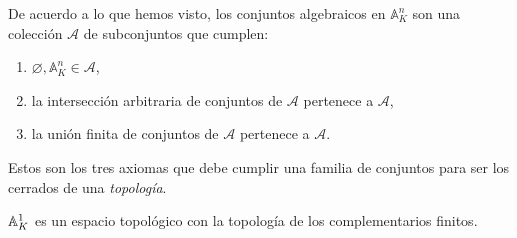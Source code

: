 \documentclass[./main.tex]{subfiles}
\begin{document}
	De acuerdo a lo que hemos visto, los conjuntos algebraicos en $\mathbb A^n_K$ son una colección $\mathcal A$ de subconjuntos que cumplen:
	\begin{enumerate}
		\item $\varnothing, \mathbb A^n_K \in \mathcal A$,
		\item la intersección arbitraria de conjuntos de $\mathcal A$ pertenece a $\mathcal A$,
		\item la unión finita de conjuntos de $\mathcal A$ pertenece a $\mathcal A$.
	\end{enumerate}
	Estos son los tres axiomas que debe cumplir una familia de conjuntos para ser los cerrados de una \emph{topología}.
	
	\begin{example} $\mathbb{A}_K^1$ es un espacio topológico con la topología de los complementarios finitos.
	\end{example}
	
\end{document}
